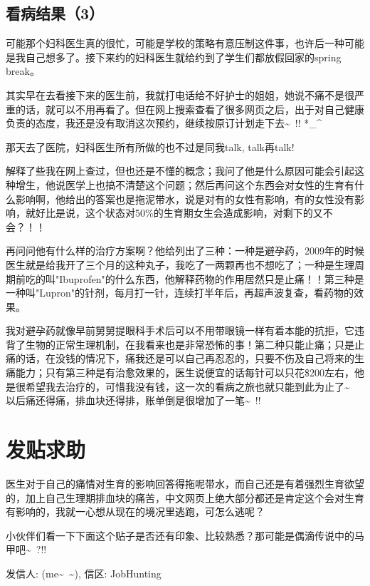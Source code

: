 \documentclass[12pt]{book}
\begin{document}
\section{看病结果（3）}
\label{sec-30-6}

可能那个妇科医生真的很忙，可能是学校的策略有意压制这件事，也许后一种可能是我自己想多了。接下来约的妇科医生就给约到了学生们都放假回家的spring break。

其实早在去看接下来的医生前，我就打电话给不好护士的姐姐，她说不痛不是很严重的话，就可以不用再看了。但在网上搜索查看了很多网页之后，出于对自己健康负责的态度，我还是没有取消这次预约，继续按原订计划走下去\textasciitilde{}~!! *\_\^{}

那天去了医院，妇科医生所有所做的也不过是同我talk, talk再talk! 

解释了些我在网上查过，但也还是不懂的概念；我问了他是什么原因可能会引起这种增生，他说医学上也搞不清楚这个问题；然后再问这个东西会对女性的生育有什么影响啊，他给出的答案也是拖泥带水，说是对有的女性有影响，有的女性没有影响，就好比是说，这个状态对50\%的生育期女生会造成影响，对剩下的又不会？！！

再问问他有什么样的治疗方案啊？他给列出了三种：一种是避孕药，2009年的时候医生就是给我开了三个月的这种丸子，我吃了一两颗再也不想吃了；一种是生理周期前吃的叫"Ibuprofen"的什么东西，他解释药物的作用居然只是止痛！！第三种是一种叫"Lupron"的针剂，每月打一针，连续打半年后，再超声波复查，看药物的效果。

我对避孕药就像早前舅舅提眼科手术后可以不用带眼镜一样有着本能的抗拒，它违背了生物的正常生理机制，在我看来也是非常恐怖的事！第二种只能止痛；只是止痛的话，在没钱的情况下，痛我还是可以自己再忍忍的，只要不伤及自己将来的生痛能力；只有第三种是有治愈效果的，医生说便宜的话每针可以只花\$200左右，他是很希望我去治疗的，可惜我没有钱，这一次的看病之旅也就只能到此为止了\textasciitilde{}~　以后痛还得痛，排血块还得排，账单倒是很增加了一笔\textasciitilde{}~!!

\chapter{发贴求助}
\label{sec-31}

医生对于自己的痛情对生育的影响回答得拖呢带水，而自己还是有着强烈生育欲望的，加上自己生理期排血块的痛苦，中文网页上绝大部分都还是肯定这个会对生育有影响的，我就一心想从现在的境况里逃跑，可怎么逃呢？

小伙伴们看一下下面这个贴子是否还有印象、比较熟悉？那可能是偶滴传说中的马甲吧\textasciitilde{}~?!!

发信人: (me\textasciitilde{}~\textasciitilde{}), 信区: JobHunting
\end{document}
